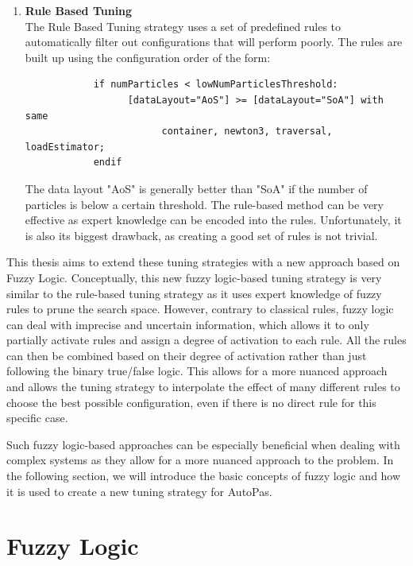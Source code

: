 \begin{enumerate}
      \item \textbf{Rule Based Tuning} \\
            The Rule Based Tuning strategy uses a set of predefined rules to automatically filter out configurations that will perform poorly. The rules are built up using the configuration order of the form:
            \begin{small}
                  \begin{verbatim}
            if numParticles < lowNumParticlesThreshold:
                  [dataLayout="AoS"] >= [dataLayout="SoA"] with same 
                        container, newton3, traversal, loadEstimator;
            endif
            \end{verbatim}
            \end{small}
            The data layout "AoS" is generally better than "SoA" if the number of particles is below a certain threshold. The rule-based method can be very effective as expert knowledge can be encoded into the rules. Unfortunately, it is also its biggest drawback, as creating a good set of rules is not trivial.
\end{enumerate}


This thesis aims to extend these tuning strategies with a new approach based on Fuzzy Logic. Conceptually, this new fuzzy logic-based tuning strategy is very similar to the rule-based tuning strategy as it uses expert knowledge of fuzzy rules to prune the search space. However, contrary to classical rules, fuzzy logic can deal with imprecise and uncertain information, which allows it to only partially activate rules and assign a degree of activation to each rule. All the rules can then be combined based on their degree of activation rather than just following the binary true/false logic. This allows for a more nuanced approach and allows the tuning strategy to interpolate the effect of many different rules to choose the best possible configuration, even if there is no direct rule for this specific case.

Such fuzzy logic-based approaches can be especially beneficial when dealing with complex systems  as they allow for a more nuanced approach to the problem. In the following section, we will introduce the basic concepts of fuzzy logic and how it is used to create a new tuning strategy for AutoPas.


\section{Fuzzy Logic}

